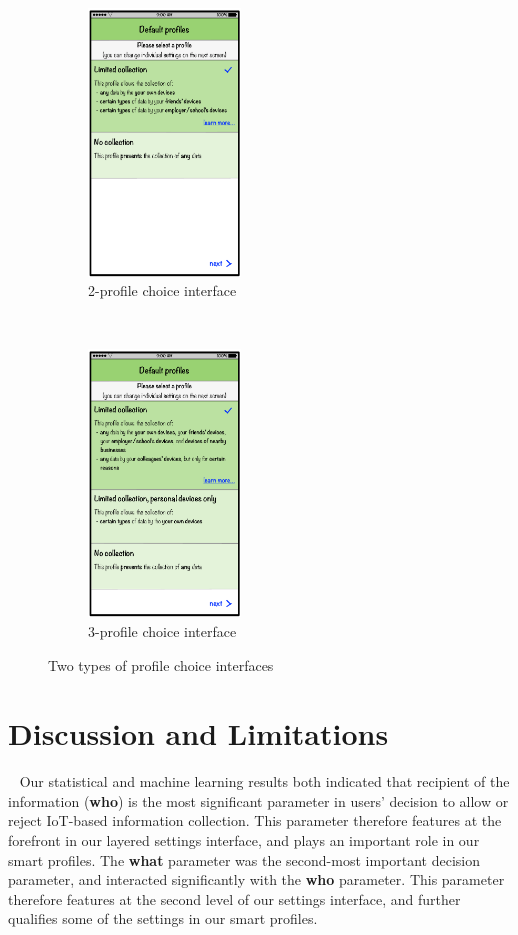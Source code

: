 \begin{figure}
	\centering
	\begin{subfigure}[t]{0.48\textwidth}
		\centering
		\includegraphics[height=2.8in]{figures/profiles2.pdf}
		\caption{2-profile choice interface}
		\label{fig:2profile_default_setting}
	\end{subfigure}%
	~~
	\begin{subfigure}[t]{0.48\textwidth}
		\centering
		\includegraphics[height=2.8in]{figures/profiles3.pdf}
		\caption{3-profile choice interface}
		\label{fig:3profile_default_setting}
	\end{subfigure}%
	\caption{Two types of profile choice interfaces}
\end{figure}

\section{Discussion and Limitations}~\label{sec:publiclim}
Our statistical and machine learning results both indicated that recipient of the information (\textbf{who}) is the most significant parameter in users' decision to allow or reject IoT-based information collection. This parameter therefore features at the forefront in our layered settings interface, and plays an important role in our smart profiles. The \textbf{what} parameter was the second-most important decision parameter, and interacted significantly with the \textbf{who} parameter. This parameter therefore features at the second level of our settings interface, and further qualifies some of the settings in our smart profiles.

